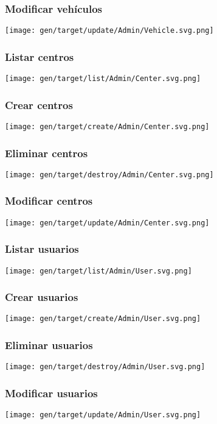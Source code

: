 \subsubsection{Modificar vehículos}
\texttt{[image: gen/target/update/Admin/Vehicle.svg.png]}

\subsubsection{Listar centros}
\texttt{[image: gen/target/list/Admin/Center.svg.png]}

\subsubsection{Crear centros}
\texttt{[image: gen/target/create/Admin/Center.svg.png]}

\subsubsection{Eliminar centros}
\texttt{[image: gen/target/destroy/Admin/Center.svg.png]}

\subsubsection{Modificar centros}
\texttt{[image: gen/target/update/Admin/Center.svg.png]}

\subsubsection{Listar usuarios}
\texttt{[image: gen/target/list/Admin/User.svg.png]}

\subsubsection{Crear usuarios}
\texttt{[image: gen/target/create/Admin/User.svg.png]}

\subsubsection{Eliminar usuarios}
\texttt{[image: gen/target/destroy/Admin/User.svg.png]}

\subsubsection{Modificar usuarios}
\texttt{[image: gen/target/update/Admin/User.svg.png]}

